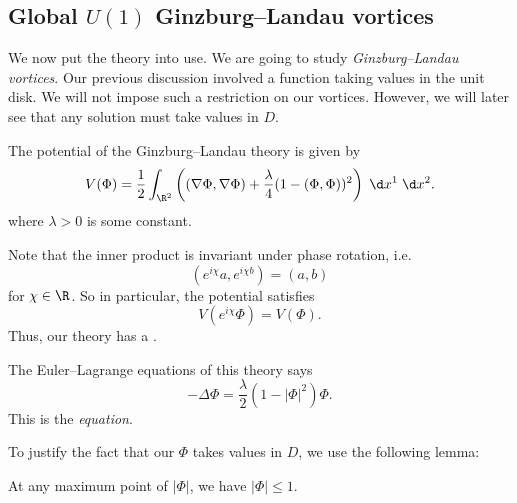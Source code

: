 \documentclass[a4paper]{article}
\begin{document}
%

\subsection{Global \texorpdfstring{$U(1)$}{U(1)} Ginzburg--Landau vortices}
We now put the theory into use. We are going to study \emph{Ginzburg--Landau vortices}. Our previous discussion involved a function taking values in the unit disk. We will not impose such a restriction on our vortices. However, we will later see that any solution must take values in $D$.

The potential of the Ginzburg--Landau theory is given by
\[
  V(\Phi) = \frac{1}{2} \int_{\R^2} \left((\nabla \Phi, \nabla \Phi) + \frac{\lambda}{4} (1 - (\Phi, \Phi))^2 \right)\;\d x^1 \;\d x^2.
\]
where $\lambda > 0$ is some constant.

Note that the inner product is invariant under phase rotation, i.e.
\[
  (e^{i\chi} a, e^{i\chi b}) = (a, b)
\]
for $\chi \in \R$. So in particular, the potential satisfies
\[
  V(e^{i\chi}\Phi) = V(\Phi).
\]
Thus, our theory has a .

The Euler--Lagrange equations of this theory says
\[
  - \Delta \Phi = \frac{\lambda}{2}(1 - |\Phi|^2) \Phi.
\]
This is the  \emph{equation}.

To justify the fact that our $\Phi$ takes values in $D$, we use the following lemma:
\begin{lemma}
  At any maximum point of $|\Phi|$, we have $|\Phi| \leq 1$.
\end{lemma}
\end{document}
